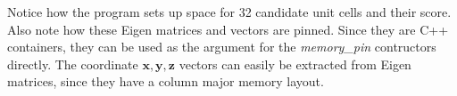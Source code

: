 \documentclass[a4paper,10pt]{article}
\newcommand{\vect}[1]{\mathbf{#1}}
\begin{document}
%
Notice how the program sets up space for 32 candidate unit cells and their score. Also note how these Eigen matrices and vectors are pinned. Since they are C++ containers, they can be used as the argument for the \emph{memory\_pin} contructors directly. The coordinate $\vect{x},\vect{y},\vect{z}$ vectors can easily be extracted from Eigen matrices, since they have a column major memory layout.
\end{document}
